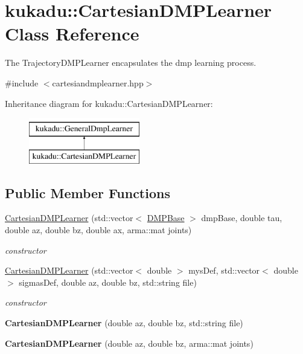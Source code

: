 \hypertarget{classkukadu_1_1CartesianDMPLearner}{\section{kukadu\-:\-:Cartesian\-D\-M\-P\-Learner Class Reference}
\label{classkukadu_1_1CartesianDMPLearner}
}


The Trajectory\-D\-M\-P\-Learner encapsulates the dmp learning process.  




{\ttfamily \#include $<$cartesiandmplearner.\-hpp$>$}

Inheritance diagram for kukadu\-:\-:Cartesian\-D\-M\-P\-Learner\-:\begin{figure}[H]
\begin{center}
\leavevmode
\includegraphics[height=2.000000cm]{classkukadu_1_1CartesianDMPLearner}
\end{center}
\end{figure}
\subsection*{Public Member Functions}
\begin{DoxyCompactItemize}
\item 
\hyperlink{classkukadu_1_1CartesianDMPLearner_a5e1f50a8e9ca6279dec1e797539776e3}{Cartesian\-D\-M\-P\-Learner} (std\-::vector$<$ \hyperlink{classkukadu_1_1DMPBase}{D\-M\-P\-Base} $>$ dmp\-Base, double tau, double az, double bz, double ax, arma\-::mat joints)
\begin{DoxyCompactList}\small\item\em constructor \end{DoxyCompactList}\item 
\hyperlink{classkukadu_1_1CartesianDMPLearner_a827dfdfd4ae5f2052ad67d429a0b10b5}{Cartesian\-D\-M\-P\-Learner} (std\-::vector$<$ double $>$ mys\-Def, std\-::vector$<$ double $>$ sigmas\-Def, double az, double bz, std\-::string file)
\begin{DoxyCompactList}\small\item\em constructor \end{DoxyCompactList}\item 
\hypertarget{classkukadu_1_1CartesianDMPLearner_a7f6c5dd882679d153af81ec8f87e6126}{{\bfseries Cartesian\-D\-M\-P\-Learner} (double az, double bz, std\-::string file)}\label{classkukadu_1_1CartesianDMPLearner_a7f6c5dd882679d153af81ec8f87e6126}

\item 
\hypertarget{classkukadu_1_1CartesianDMPLearner_ab44433d67c81960c8b2083b74b383071}{{\bfseries Cartesian\-D\-M\-P\-Learner} (double az, double bz, arma\-::mat joints)}\label{classkukadu_1_1CartesianDMPLearner_ab44433d67c81960c8b2083b74b383071}

\end{DoxyCompactItemize}
